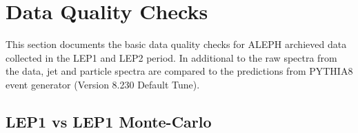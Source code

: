 \section{Data Quality Checks}

This section documents the basic data quality checks for ALEPH archieved data collected in the LEP1 and LEP2 period. In additional to the raw spectra from the data, jet and particle spectra are compared to the predictions from PYTHIA8 event generator (Version 8.230 Default Tune). 

\subsection{LEP1 vs LEP1 Monte-Carlo}
\begin{figure}[H]
\centering
{}\hfill
{}\hfill
{}\hfill
{}\hfill %
\hfill

\end{figure}
